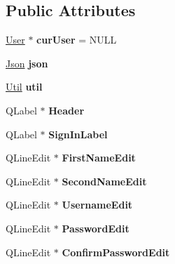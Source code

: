 \subsection*{Public Attributes}
\begin{DoxyCompactItemize}
\item 
\hypertarget{classSignupPage_aeae60650678de2e566170694a117cce0}{\hyperlink{classUser}{User} $\ast$ {\bfseries cur\-User} = N\-U\-L\-L}\label{classSignupPage_aeae60650678de2e566170694a117cce0}

\item 
\hypertarget{classSignupPage_af31808c1416a401aa65942abd91c134d}{\hyperlink{classJson}{Json} {\bfseries json}}\label{classSignupPage_af31808c1416a401aa65942abd91c134d}

\item 
\hypertarget{classSignupPage_a40679fa25d422bc6f7616c8bb332b51d}{\hyperlink{classUtil}{Util} {\bfseries util}}\label{classSignupPage_a40679fa25d422bc6f7616c8bb332b51d}

\item 
\hypertarget{classSignupPage_a669d0f940516c7c3be821b13e240a8ba}{Q\-Label $\ast$ {\bfseries Header}}\label{classSignupPage_a669d0f940516c7c3be821b13e240a8ba}

\item 
\hypertarget{classSignupPage_a2d334ba2d8cc80d5cd841045834db0c7}{Q\-Label $\ast$ {\bfseries Sign\-In\-Label}}\label{classSignupPage_a2d334ba2d8cc80d5cd841045834db0c7}

\item 
\hypertarget{classSignupPage_ad32e82ef305d5c52ee094a883d9922f8}{Q\-Line\-Edit $\ast$ {\bfseries First\-Name\-Edit}}\label{classSignupPage_ad32e82ef305d5c52ee094a883d9922f8}

\item 
\hypertarget{classSignupPage_aa76f41a9f446ec85369f1173e212a432}{Q\-Line\-Edit $\ast$ {\bfseries Second\-Name\-Edit}}\label{classSignupPage_aa76f41a9f446ec85369f1173e212a432}

\item 
\hypertarget{classSignupPage_a603f414386b5dee21a7f240c2a7c63ce}{Q\-Line\-Edit $\ast$ {\bfseries Username\-Edit}}\label{classSignupPage_a603f414386b5dee21a7f240c2a7c63ce}

\item 
\hypertarget{classSignupPage_af8d1413ac72df4295c7d539b675bf998}{Q\-Line\-Edit $\ast$ {\bfseries Password\-Edit}}\label{classSignupPage_af8d1413ac72df4295c7d539b675bf998}

\item 
\hypertarget{classSignupPage_acaa25d70cad45913c45ee98c67c97d6e}{Q\-Line\-Edit $\ast$ {\bfseries Confirm\-Password\-Edit}}\label{classSignupPage_acaa25d70cad45913c45ee98c67c97d6e}


\end{DoxyCompactItemize}
